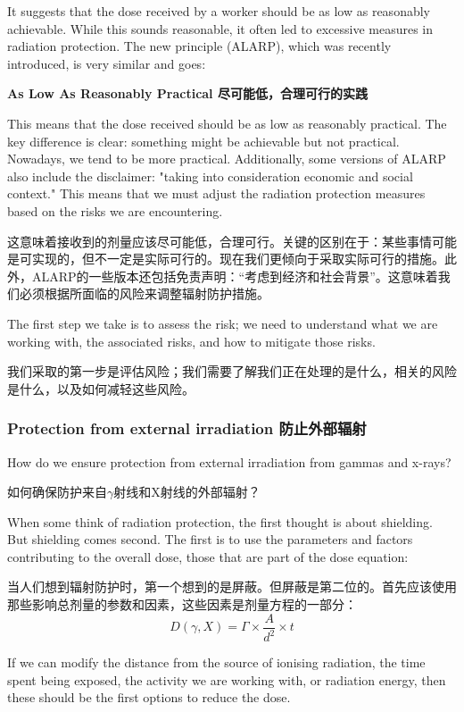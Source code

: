 \documentclass[dvipsnames, svgnames,a4paper,11pt]{article}
\begin{document}
It suggests that the dose received by a worker should be as low as reasonably achievable. While this sounds reasonable, it often led to excessive measures in radiation protection. The new principle (ALARP), which was recently introduced, is very similar and goes:

\begin{center}
      \textbf{As Low As Reasonably Practical 尽可能低，合理可行的实践}
\end{center}


This means that the dose received should be as low as reasonably practical. The key difference is clear: something might be achievable but not practical. Nowadays, we tend to be more practical. Additionally, some versions of ALARP also include the disclaimer: "taking into consideration economic and social context." This means that we must adjust the radiation protection measures based on the risks we are encountering.

这意味着接收到的剂量应该尽可能低，合理可行。关键的区别在于：某些事情可能是可实现的，但不一定是实际可行的。现在我们更倾向于采取实际可行的措施。此外，ALARP的一些版本还包括免责声明：“考虑到经济和社会背景”。这意味着我们必须根据所面临的风险来调整辐射防护措施。

The first step we take is to assess the risk; we need to understand what we are working with, the associated risks, and how to mitigate those risks.

我们采取的第一步是评估风险；我们需要了解我们正在处理的是什么，相关的风险是什么，以及如何减轻这些风险。

\subsubsection{Protection from external irradiation 防止外部辐射}  
How do we ensure protection from external irradiation from gammas and x-rays?  

如何确保防护来自$\gamma$射线和X射线的外部辐射？  

When some think of radiation protection, the first thought is about shielding. But shielding comes second. The first is to use the parameters and factors contributing to the overall dose, those that are part of the dose equation:

当人们想到辐射防护时，第一个想到的是屏蔽。但屏蔽是第二位的。首先应该使用那些影响总剂量的参数和因素，这些因素是剂量方程的一部分：
\[
D(\gamma, X) = \Gamma \times \frac{A}{d^{2}} \times t
\]

If we can modify the distance from the source of ionising radiation, the time spent being exposed, the activity we are working with, or radiation energy, then these should be the first options to reduce the dose.  
\end{document}
